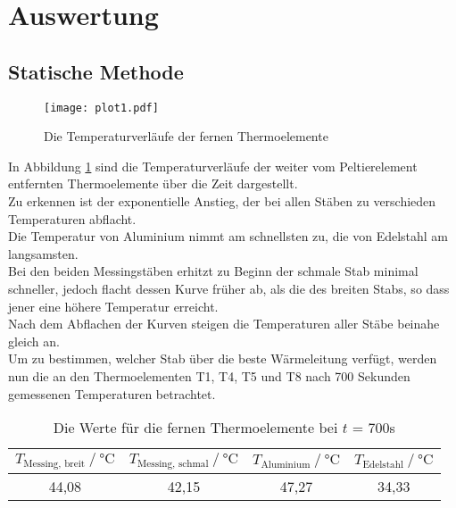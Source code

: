 \section{Auswertung}
\label{sec:Auswertung}

\subsection{Statische Methode}
\label{Statische Methode}

\begin{figure}[H]
  \centering
  \texttt{[image: plot1.pdf]}
  \caption{Die Temperaturverläufe der fernen Thermoelemente}
  \label{fig:plot1}
\end{figure}

In Abbildung \ref{fig:plot1} sind die Temperaturverläufe der
weiter vom Peltierelement entfernten Thermoelemente über die Zeit 
dargestellt.\\
Zu erkennen ist der exponentielle Anstieg, der bei allen Stäben zu verschieden Temperaturen 
abflacht. \\
Die Temperatur von Aluminium nimmt am schnellsten zu, die von Edelstahl am langsamsten.\\
Bei den beiden Messingstäben erhitzt zu Beginn der schmale Stab minimal schneller, 
jedoch flacht dessen Kurve früher ab, als die des breiten Stabs, so dass jener eine höhere 
Temperatur erreicht.\\
Nach dem Abflachen der Kurven steigen die Temperaturen aller Stäbe beinahe gleich an.\\

Um zu bestimmen, welcher Stab über die beste Wärmeleitung 
verfügt, werden nun die an den Thermoelementen T1, T4, T5 und T8 nach 700 Sekunden
gemessenen Temperaturen betrachtet.

\begin{table}[H]
  \centering
  \caption{Die Werte für die fernen Thermoelemente bei $t$ = 700s}
  \begin{tabular}{cccc}
    \toprule
    {$T_{\textrm{Messing, breit}} \mathbin{/} \unit{\degreeCelsius}$} &
    {$T_{\textrm{Messing, schmal}} \mathbin{/} \unit{\degreeCelsius}$} &    %
    {$T_{\textrm{Aluminium}} \mathbin{/} \unit{\degreeCelsius}$} &
    {$T_{\textrm{Edelstahl}} \mathbin{/} \unit{\degreeCelsius}$} \\
    \midrule
    44,08 & 42,15 & 47,27 & 34,33 \\   
    \bottomrule
  \end{tabular}
  \label{tab:Tabelle1}
\end{table}

